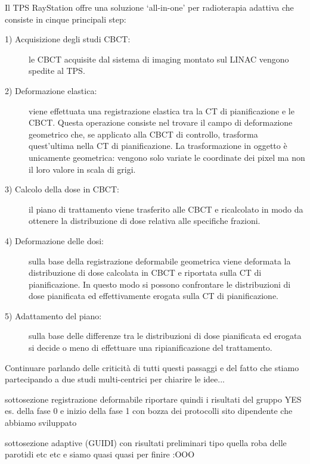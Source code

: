 Il TPS RayStation offre una soluzione `all-in-one' per radioterapia adattiva che consiste in cinque principali step:
\begin{description}
\item[1) Acquisizione degli studi CBCT:] le CBCT acquisite dal sistema di imaging montato sul LINAC vengono spedite al TPS.
\item[2) Deformazione elastica:] viene effettuata una registrazione elastica tra la CT di pianificazione e le CBCT. Questa operazione consiste nel trovare il campo di deformazione geometrico che, se applicato alla CBCT di controllo,   trasforma quest'ultima nella CT di pianificazione. La trasformazione in oggetto è unicamente geometrica: vengono solo variate le coordinate dei pixel ma non il loro valore in scala di grigi.
\item[3) Calcolo della dose in CBCT:] il piano di trattamento viene trasferito alle CBCT e ricalcolato in modo da ottenere la distribuzione di dose relativa alle specifiche frazioni. 
\item[4) Deformazione delle dosi:] sulla base della registrazione deformabile geometrica viene deformata la distribuzione di dose calcolata in CBCT e riportata sulla CT di pianificazione. In questo modo si possono confrontare le distribuzioni di dose pianificata ed effettivamente erogata sulla CT di pianificazione.
\item[5) Adattamento del piano:] sulla base delle differenze tra le distribuzioni di dose pianificata ed erogata si decide o meno di effettuare una ripianificazione del trattamento.
\end{description}

Continuare parlando delle criticità di tutti questi passaggi e del fatto che stiamo partecipando a due studi multi-centrici per chiarire le idee...

sottosezione registrazione deformabile
riportare quindi i risultati del gruppo YES es. della fase 0 e inizio della fase 1 con bozza dei protocolli sito dipendente che abbiamo sviluppato

sottosezione adaptive (GUIDI) con risultati preliminari tipo quella roba delle parotidi etc etc e siamo quasi quasi per finire :OOO









